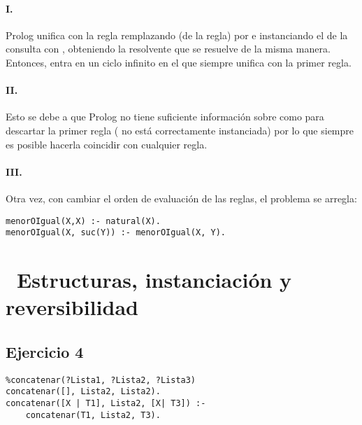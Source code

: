 \documentclass[10pt,a4paper]{article}
\begin{document}
\paragraph{I.} Prolog  unifica  con la regla  remplazando  (de la regla) por  e instanciando el  de la consulta con , obteniendo la resolvente   que se resuelve de la misma manera. Entonces, entra en un ciclo infinito en el que siempre unifica con la primer regla.
\paragraph{II.} Esto se debe a que Prolog no tiene suficiente información sobre  como para descartar la primer regla ( no está correctamente instanciada) por lo que siempre es posible hacerla coincidir con cualquier regla.

\paragraph{III.} Otra vez, con cambiar el orden de evaluación de las reglas, el problema se arregla:
\begin{verbatim}
menorOIgual(X,X) :- natural(X).
menorOIgual(X, suc(Y)) :- menorOIgual(X, Y).
\end{verbatim}

\section*{\ Estructuras, instanciación y reversibilidad}

\subsection{Ejercicio 4}
\begin{centrado}
\begin{verbatim}
%concatenar(?Lista1, ?Lista2, ?Lista3)
concatenar([], Lista2, Lista2).
concatenar([X | T1], Lista2, [X| T3]) :-
	concatenar(T1, Lista2, T3).
\end{verbatim}
\end{centrado}
\end{document}
